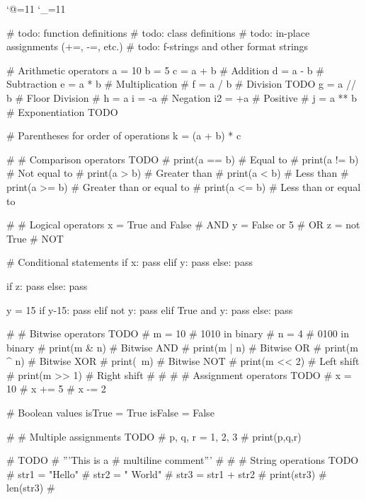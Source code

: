\let\e\expandafter
\catcode`@=11
\catcode`_=11

\def\@pytexError#1{%
	\errmessage{#1}%
}

\loggingall











\def\@pytexChar@DoubleQuote{\relax}
\def\@pytexChar@SingleQuote{\relax}

\def\begin#1{
	\@pytexMakeAllActive
}
\def\end#1{
	\message{parsing!}
	\@pytexResetCatcodes
	\@pytexParser@parse
}

\begin{python}

# todo: function definitions
# todo: class definitions
# todo: in-place assignments (+=, -=, etc.)
# todo: f-strings and other format strings


# Arithmetic operators
a = 10
b = 5
c = a + b  # Addition
d = a - b  # Subtraction
e = a * b  # Multiplication
# f = a / b  # Division TODO
g = a // b # Floor Division
# h = a %
i = -a     # Negation
i2 = +a    # Positive
# j = a ** b # Exponentiation TODO


# Parentheses for order of operations
k = (a + b) * c

# # Comparison operators TODO
# print(a == b)  # Equal to
# print(a != b)  # Not equal to
# print(a > b)   # Greater than
# print(a < b)   # Less than
# print(a >= b)  # Greater than or equal to
# print(a <= b)  # Less than or equal to


# # Logical operators
x = True and False  # AND
y = False or 5   # OR
z = not True        # NOT


# Conditional statements
if x:
    pass
elif y:
    pass
else:
    pass


if z:
    pass
else:
    pass

y = 15
if y-15:
    pass
elif not y:
	pass
elif True and y:
    pass
else:
    pass


# # Bitwise operators TODO
# m = 10  # 1010 in binary
# n = 4   # 0100 in binary
# print(m & n)  # Bitwise AND
# print(m | n)  # Bitwise OR
# print(m ^ n)  # Bitwise XOR
# print(~m)   # Bitwise NOT
# print(m << 2) # Left shift
# print(m >> 1) # Right shift
# 
# 
# # Assignment operators TODO
# x = 10
# x += 5
# x -= 2

# Boolean values
isTrue = True
isFalse = False

# # Multiple assignments TODO
# p, q, r = 1, 2, 3
# print(p,q,r)

# TODO
# '''This is a
# multiline comment'''
# 
# 
# String operations TODO
# str1 = "Hello"
# str2 = " World"
# str3 = str1 + str2
# print(str3)
# len(str3)
# 

\end{python}

\bye
